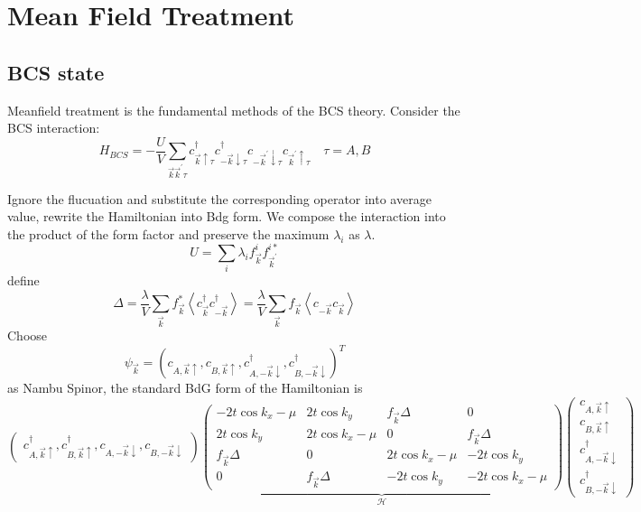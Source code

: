 \documentclass[12pt]{article}
\numberwithin{equation}{section}
\begin{document}
\section{Mean Field Treatment}
\subsection{BCS state}
Meanfield treatment is the fundamental methods of the BCS theory. Consider the BCS interaction:
\begin{equation}
	H_{B C S}=-\frac{U}{V} \sum_{\vec{k} \vec{k}^{\prime} \tau} c_{\vec{k} \uparrow\tau }^{\dagger} c_{-\vec{k} \downarrow\tau }^{\dagger} c_{-\vec{k}^{\prime} \downarrow \tau} c_{\vec{k}^{\prime} \uparrow \tau}\quad \tau = A,B
	\end{equation}

Ignore the flucuation and substitute the corresponding operator into average value, rewrite the Hamiltonian into Bdg form. We compose the interaction into the product of the form factor and preserve the maximum $\lambda_i$ as $\lambda$.
\begin{equation}
	U =\sum_{i}\lambda_i f^i_{\vec{k}} f^{i*}_{\vec{k}^\prime}
\end{equation}
define
\begin{equation}
	\Delta=\frac{\lambda}{V} \sum_{\vec{k}} f_{\vec{k}}^{*}\left\langle c_{\vec{k}}^{\dagger} c_{-\vec{k}}^{\dagger}\right\rangle=\frac{\lambda}{V} \sum_{\vec{k}} f_{\vec{k}}\left\langle c_{-\vec{k}} c_{\vec{k}}\right\rangle
	\end{equation}
Choose \begin{equation}
	\psi_{\vec{k}}=\left(c_{A, \vec{k} \uparrow}, c_{B, \vec{k} \uparrow}, c_{A,-\vec{k} \downarrow}^{\dagger}, c_{B,-\vec{k} \downarrow}^{\dagger}\right)^{T}
	\end{equation}
as Nambu Spinor, the standard BdG form of the Hamiltonian is 
\begin{equation}
	\left(\begin{array}{cccc}
		c_{A, \vec{k} \uparrow}^\dagger, c_{B, \vec{k} \uparrow}^\dagger, c_{A,-\vec{k} \downarrow}, c_{B,-\vec{k} \downarrow}
	\end{array}\right) \underbrace{\left(\begin{array}{cccc}
	-2t\cos k_x-\mu & 2t\cos k_y & f_{\vec{k}}\Delta & 0 \\
	2t\cos k_y & 2t\cos k_x-\mu & 0 & f_{\vec{k}}\Delta \\
	f_{\vec{k}}\Delta & 0 & 2t\cos k_x-\mu & -2t\cos k_y \\
	0 & f_{\vec{k}}\Delta & -2t\cos k_y & -2t\cos k_x-\mu
	\end{array}\right)}_{\mathcal{H}}\left(\begin{array}{c}
		c_{A, \vec{k} \uparrow}\\
		c_{B, \vec{k} \uparrow}\\
		c_{A,-\vec{k} \downarrow}^{\dagger} \\
		c_{B,-\vec{k} \downarrow}^{\dagger}
	\end{array}\right)
	\end{equation}
\end{document}
